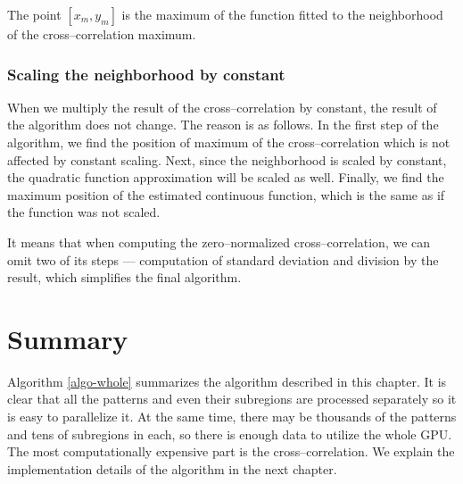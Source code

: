 The point $[x_m, y_m]$ is the maximum of the function fitted to the neighborhood of the cross--correlation maximum.

\subsubsection{Scaling the neighborhood by constant}

When we multiply the result of the cross--correlation by constant, the result of the algorithm does not change. The reason is as follows. In the first step of the algorithm, we find the position of maximum of the cross--correlation which is not affected by constant scaling. Next, since the neighborhood is scaled by constant, the quadratic function approximation will be scaled as well. Finally, we find the maximum position of the estimated continuous function, which is the same as if the function was not scaled.

It means that when computing the zero--normalized cross--correlation, we can omit two of its steps --- computation of standard deviation and division by the result, which simplifies the final algorithm.

\section{Summary}
\label{algo-summary}
Algorithm \ref{algo-whole} summarizes the algorithm described in this chapter. It is clear that all the patterns and even their subregions are processed separately so it is easy to parallelize it. At the same time, there may be thousands of the patterns and tens of subregions in each, so there is enough data to utilize the whole GPU. The most computationally expensive part is the cross--correlation. We explain the implementation details of the algorithm in the next chapter.

